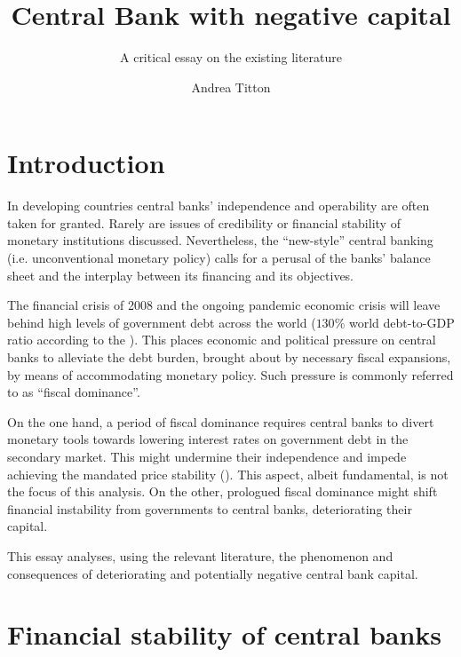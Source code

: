 \documentclass[american]{scrartcl}
\title{Central Bank with negative capital} %
\subtitle{A critical essay on the existing literature}
\author{Andrea Titton}
\begin{document}
\clearpage
\thispagestyle{empty}
\maketitle
\clearpage


\iffalse
    History | Theory of CB dividends | Financial stability under deferred assets |
    Expectations of Inflation | Effects on global banks
\fi


\section{Introduction}

In developing countries central banks' independence and operability are often taken for granted. Rarely are issues of credibility or financial stability of monetary institutions discussed. Nevertheless, the ``new-style'' central banking (i.e. unconventional monetary policy) calls for a perusal of the banks' balance sheet and the interplay between its financing and its objectives.

The financial crisis of 2008 and the ongoing pandemic economic crisis will leave behind high levels of government debt across the world ($130\%$ world debt-to-GDP ratio according to the \cite{WEO2020}). This places economic and political pressure on central banks to alleviate the debt burden, brought about by necessary fiscal expansions, by means of accommodating monetary policy. Such pressure is commonly referred to as ``fiscal dominance''.

On the one hand, a period of fiscal dominance requires central banks to divert monetary tools towards lowering interest rates on government debt in the secondary market. This might undermine their independence and impede achieving the mandated price stability (\cite{Schnabel2020}). This aspect, albeit fundamental, is not the focus of this analysis. On the other, prologued fiscal dominance might shift financial instability from governments to central banks, deteriorating their capital. %

This essay analyses, using the relevant literature, the phenomenon and consequences of deteriorating and potentially negative central bank capital. %

\section{Financial stability of central banks}
\end{document}
